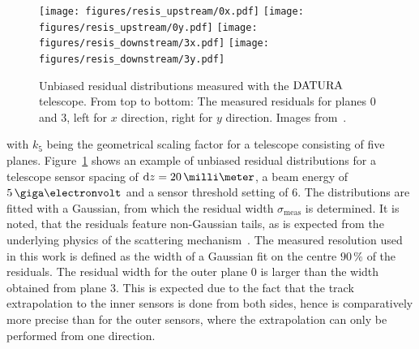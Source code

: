 \begin{figure}[tb]
  \centering
  \texttt{[image: figures/resis\_upstream/0x.pdf]}
  \texttt{[image: figures/resis\_upstream/0y.pdf]}
  \texttt{[image: figures/resis\_downstream/3x.pdf]}
  \texttt{[image: figures/resis\_downstream/3y.pdf]}
  \caption[Residual examples to determine the $\Datura$ telescope's resolution~\cite{ref:thomas}]{Unbiased residual distributions measured with the $\Datura$ telescope.
From top to bottom: The measured residuals for planes $0$ and $3$, left for $x$ direction, right for $y$ direction.
Images from~\cite{ref:thomas}.}
  \label{fig:residualexample1}
\end{figure}

with $k_5$ being the geometrical scaling factor for a telescope consisting of five planes.
Figure~\ref{fig:residualexample1} shows an example of unbiased residual distributions for a telescope sensor spacing of $\dz = 20\,\milli\meter$,
 a beam energy of $5\,\giga\electronvolt$ and a sensor threshold setting of $6$.
The distributions are fitted with a Gaussian, from which the residual width $\sigma_{\textrm{meas}}$ is determined.
It is noted, that the residuals feature non-Gaussian tails, as is expected from the underlying physics of the scattering mechanism~\cite{ref:PDG-2014}. 
The measured resolution used in this work is defined as the width of a Gaussian fit on the centre $90\,\%$ of the residuals. 
The residual width for the outer plane $0$ is larger than the width obtained from plane $3$.
This is expected due to the fact that the track extrapolation to the inner sensors is done from both sides, hence is comparatively more precise than for the outer sensors, where the extrapolation can only be performed from one direction. 






% 

